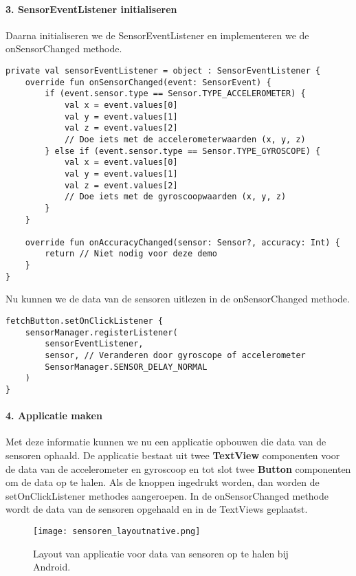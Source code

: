 \paragraph{3. SensorEventListener initialiseren}
Daarna initialiseren we de SensorEventListener en implementeren we de onSensorChanged methode.
\begin{verbatim}
private val sensorEventListener = object : SensorEventListener {
    override fun onSensorChanged(event: SensorEvent) {
        if (event.sensor.type == Sensor.TYPE_ACCELEROMETER) {
            val x = event.values[0]
            val y = event.values[1]
            val z = event.values[2]
            // Doe iets met de accelerometerwaarden (x, y, z)
        } else if (event.sensor.type == Sensor.TYPE_GYROSCOPE) {
            val x = event.values[0]
            val y = event.values[1]
            val z = event.values[2]
            // Doe iets met de gyroscoopwaarden (x, y, z)
        }
    }

    override fun onAccuracyChanged(sensor: Sensor?, accuracy: Int) {
        return // Niet nodig voor deze demo
    }
}
\end{verbatim}
Nu kunnen we de data van de sensoren uitlezen in de onSensorChanged methode.
\begin{verbatim}
fetchButton.setOnClickListener {
    sensorManager.registerListener(
        sensorEventListener,
        sensor, // Veranderen door gyroscope of accelerometer
        SensorManager.SENSOR_DELAY_NORMAL
    )
}
\end{verbatim}

\paragraph{4. Applicatie maken}
Met deze informatie kunnen we nu een applicatie opbouwen die data van de sensoren 
ophaald. De applicatie bestaat uit twee \textbf{TextView} componenten voor de data van de 
accelerometer en gyroscoop en tot slot twee \textbf{Button} componenten om de data op te halen. 
Als de knoppen ingedrukt worden, dan worden de setOnClickListener methodes aangeroepen.
In de onSensorChanged methode wordt de data van de sensoren opgehaald en in de TextViews
geplaatst.
\begin{figure}[H]
    \centering
    \texttt{[image: sensoren\_layoutnative.png]}
    \caption{Layout van applicatie voor data van sensoren op te halen bij Android.}
\end{figure}